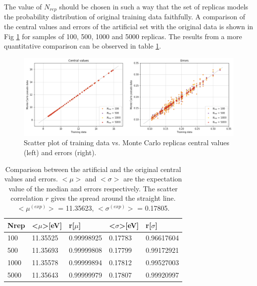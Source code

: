 \documentclass[11pt,a4paper]{article}
\numberwithin{equation}{section}
\numberwithin{figure}{section}
\numberwithin{table}{section}
\begin{document}
The value of $N_{rep}$ should be chosen in such a way that the set of replicas models the probability distribution of original training data faithfully. A comparison of the central values and errors of the artificial set with the original data is shown in Fig \ref{mc} for samples of 100, 500, 1000 and 5000 replicas. The results from a more quantitative comparison can be observed in table \ref{tablemc}.

\begin{figure}[H]
    \centering 
    \includegraphics[width=160mm]{plots/MC.png}
    \caption{Scatter plot of training data vs. Monte Carlo replicas central values (left) and errors (right). }
    \label{mc}
\end{figure}

\begin{table}[H]
\centering
\begin{tabular}{|l|ll|ll|}
\hline
Nrep & \textless{}$\mu$\textgreater {[}eV{]} & r{[}$\mu${]} & \textless{}$\sigma$\textgreater {[}eV{]} & r{[}$\sigma${]} \\ \hline
100  & 11.35525                              & 0.99998925   & 0.17783                                  & 0.96617604      \\ \hline
500  & 11.35693                              & 0.99999808   & 0.17799                                  & 0.99172921      \\ \hline
1000 & 11.35578                              & 0.99999894   & 0.17812                                  & 0.99527003      \\ \hline
5000 & 11.35643                              & 0.99999979   & 0.17807                                  & 0.99920997      \\ \hline
\end{tabular}
\caption{Comparison between the artificial and the original central values and errors. $<\mu>$ and $<\sigma>$ are the expectation value of the median and errors respectively. The scatter correlation $r$ gives the spread around the straight line. $<\mu^{(exp)}>$ = 11.35623, $<\sigma^{(exp)}>$ = 0.17805. }
\label{tablemc}
\end{table}
\end{document}
